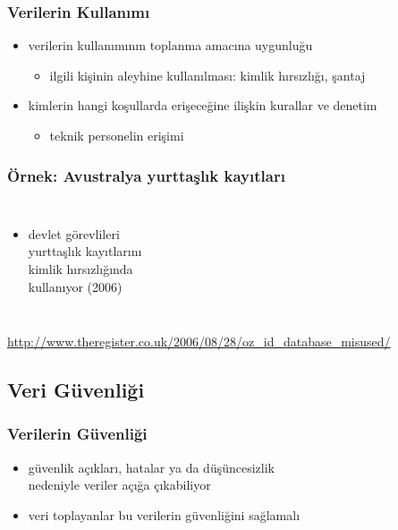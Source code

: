 \documentclass[dvipsnames]{beamer}
\theoremstyle{definition}
\theoremstyle{example}
\theoremstyle{plain}
\begin{document}
\begin{frame}
  \frametitle{Verilerin Kullanımı}

  \begin{itemize}
    \item verilerin kullanımının toplanma amacına uygunluğu
    \begin{itemize}
      \item ilgili kişinin aleyhine kullanılması: kimlik hırsızlığı, şantaj
    \end{itemize}

    \pause
    \medskip
    \item kimlerin hangi koşullarda erişeceğine ilişkin kurallar ve denetim
    \begin{itemize}
      \item teknik personelin erişimi
    \end{itemize}
  \end{itemize}
\end{frame}

\begin{frame}
  \frametitle{Örnek: Avustralya yurttaşlık kayıtları}

  \begin{columns}

    \begin{itemize}
      \item devlet görevlileri\\
        yurttaşlık kayıtlarını\\
        kimlik hırsızlığında\\
        kullanıyor (2006)
    \end{itemize}
  \end{columns}

  \medskip
  \tiny{\url{http://www.theregister.co.uk/2006/08/28/oz_id_database_misused/}}\\
\end{frame}

\subsection{Veri Güvenliği}

\begin{frame}
  \frametitle{Verilerin Güvenliği}

  \begin{itemize}
    \item güvenlik açıkları, hatalar ya da düşüncesizlik\\
      nedeniyle veriler açığa çıkabiliyor
    \item veri toplayanlar bu verilerin güvenliğini sağlamalı
  \end{itemize}
\end{frame}
\end{document}
